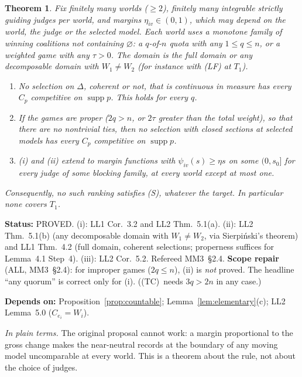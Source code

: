 \documentclass[11pt]{article}
\newtheorem{theorem}{Theorem}[section]
\theoremstyle{definition}
\theoremstyle{remark}
\newcommand{\supp}{\operatorname{supp}}
\newcommand{\src}[1]{\textsf{#1}}
\newcommand{\status}[1]{\par\smallskip\noindent\textbf{Status:} #1\par}
\newcommand{\deps}[1]{\noindent\textbf{Depends on:} #1\par}
\newcommand{\inwords}[1]{\noindent\textit{In plain terms.} #1\par\smallskip}
\newcommand{\TC}{\textup{(TC)}}
\begin{document}
\begin{theorem}\label{thm:fixed-exclusion}
Fix finitely many worlds ($\ge2$), finitely many integrable strictly guiding judges per world, and margins $\eta_{iv}\in(0,1)$, which may depend on the world, the judge or the selected model. Each world uses a monotone family of winning coalitions not containing $\varnothing$: a $q$-of-$n$ quota with any $1\le q\le n$, or a weighted game with any $\tau>0$. The domain is the full domain or any decomposable domain with $W_1\ne W_2$ (for instance with (LF) at $T_1$).
\begin{enumerate}[label=(\roman*)]
\item No selection on $\Delta$, coherent or not, that is continuous in measure has every $C_p$ competitive on $\supp p$. This holds for \emph{every} $q$.
\item If the games are proper ($2q>n$, or $2\tau$ greater than the total weight), so that there are no nontrivial ties, then no selection with closed sections at selected models has every $C_p$ competitive on $\supp p$.
\item (i) and (ii) extend to margin functions with $\psi_{iv}(s)\ge\eta s$ on some $(0,s_0]$ for every judge of some blocking family, at every world except at most one.
\end{enumerate}
Consequently, no such ranking satisfies (S), whatever the target. In particular none covers $T_1$.
\end{theorem}
\status{PROVED. (i): \src{LL1} Cor.~3.2 and \src{LL2} Thm.~5.1(a). (ii): \src{LL2} Thm.~5.1(b) (any decomposable domain with $W_1\ne W_2$, via Sierpi\'nski's theorem) and \src{LL1} Thm.~4.2 (full domain, coherent selections; properness suffices for Lemma~4.1 Step~4). (iii): \src{LL2} Cor.~5.2. Refereed \src{MM3}~\S2.4. \textbf{Scope repair} (\src{ALL}, \src{MM3}~\S2.4): for improper games ($2q\le n$), (ii) is \emph{not} proved. The headline ``any quorum'' is correct only for (i). (\TC\ needs $3q>2n$ in any case.)}
\deps{Proposition~\ref{prop:countable}; Lemma~\ref{lem:elementary}(c); \src{LL2} Lemma~5.0 ($C_{e_i}=W_i$).}
\inwords{The original proposal cannot work: a margin proportional to the gross change makes the near-neutral records at the boundary of any moving model uncomparable at every world. This is a theorem about the rule, not about the choice of judges.}
\end{document}
